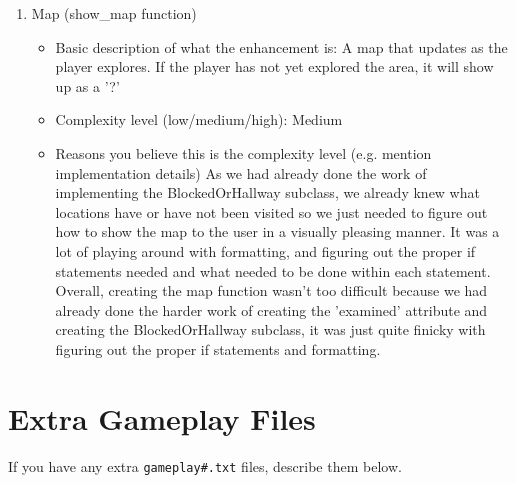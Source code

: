 \documentclass[11pt]{article}
\begin{document}
\begin{enumerate}
\item Map (show_map function)
	\begin{itemize}
	\item Basic description of what the enhancement is: A map that updates as the player explores.
	If the player has not yet explored the area, it will show up as a '?'
	\item Complexity level (low/medium/high): Medium
	\item Reasons you believe this is the complexity level (e.g. mention implementation details)
	As we had already done the work of implementing the BlockedOrHallway subclass, we already knew what locations have
	or have not been visited so we just needed to figure out how to show the map to the user in a visually pleasing
	manner. It was a lot of playing around with formatting, and figuring out the proper if statements needed and what
	needed to be done within each statement. Overall, creating the map function wasn't too difficult because we had
	already done the harder work of creating the 'examined' attribute and creating the BlockedOrHallway subclass, it
	was just quite finicky with figuring out the proper if statements and formatting.
	\end{itemize}




\end{enumerate}


\section*{Extra Gameplay Files}

If you have any extra \texttt{gameplay\#.txt} files, describe them below.
\end{document}
